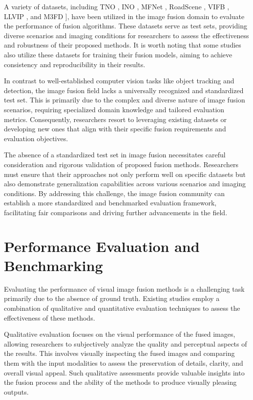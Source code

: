 A variety of datasets, including TNO \cite{toet2014tno}, INO \cite{inodataset}, MFNet \cite{ha2017mfnet}, RoadScene \cite{xu2020fusiondn}, VIFB \cite{zhang2020vifb}, LLVIP \cite{jia2021llvip}, and M3FD \cite{liu2022target}], have been utilized in the image fusion domain to evaluate the performance of fusion algorithms. These datasets serve as test sets, providing diverse scenarios and imaging conditions for researchers to assess the effectiveness and robustness of their proposed methods. It is worth noting that some studies also utilize these datasets for training their fusion models, aiming to achieve consistency and reproducibility in their results.

In contrast to well-established computer vision tasks like object tracking and detection, the image fusion field lacks a universally recognized and standardized test set. This is primarily due to the complex and diverse nature of image fusion scenarios, requiring specialized domain knowledge and tailored evaluation metrics. Consequently, researchers resort to leveraging existing datasets or developing new ones that align with their specific fusion requirements and evaluation objectives.

The absence of a standardized test set in image fusion necessitates careful consideration and rigorous validation of proposed fusion methods. Researchers must ensure that their approaches not only perform well on specific datasets but also demonstrate generalization capabilities across various scenarios and imaging conditions. By addressing this challenge, the image fusion community can establish a more standardized and benchmarked evaluation framework, facilitating fair comparisons and driving further advancements in the field.

\section{Performance Evaluation and Benchmarking}

Evaluating the performance of visual image fusion methods is a challenging task primarily due to the absence of ground truth. Existing studies employ a combination of qualitative and quantitative evaluation techniques to assess the effectiveness of these methods.

Qualitative evaluation focuses on the visual performance of the fused images, allowing researchers to subjectively analyze the quality and perceptual aspects of the results. This involves visually inspecting the fused images and comparing them with the input modalities to assess the preservation of details, clarity, and overall visual appeal. Such qualitative assessments provide valuable insights into the fusion process and the ability of the methods to produce visually pleasing outputs.

